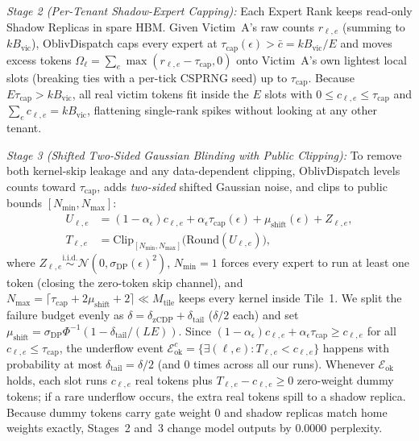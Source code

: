 \documentclass[11pt,a4paper]{article}
\renewcommand{\_}{\textunderscore\allowbreak}
\def\OD{OblivDispatch}%
\theoremstyle{definition}
\theoremstyle{remark}
\newcommand{\OD}{\textsc{OblivDispatch}}
\begin{document}
\emph{Stage 2 (Per-Tenant Shadow-Expert Capping):} Each Expert Rank keeps read-only Shadow Replicas in spare HBM. Given Victim~A's raw counts $r_{\ell, e}$ (summing to $k B_{\mathrm{vic}}$), \OD{} caps every expert at $\tau_{\mathrm{cap}}(\epsilon) > \bar{c} = k B_{\mathrm{vic}}/E$ and moves excess tokens $\Omega_\ell = \sum_e \max(r_{\ell, e} - \tau_{\mathrm{cap}}, 0)$ onto Victim~A's own lightest local slots (breaking ties with a per-tick CSPRNG seed) up to $\tau_{\mathrm{cap}}$. Because $E \tau_{\mathrm{cap}} > k B_{\mathrm{vic}}$, all real victim tokens fit inside the $E$ slots with $0 \le c_{\ell, e} \le \tau_{\mathrm{cap}}$ and $\sum_e c_{\ell, e} = k B_{\mathrm{vic}}$, flattening single-rank spikes without looking at any other tenant.

\emph{Stage 3 (Shifted Two-Sided Gaussian Blinding with Public Clipping):} To remove both kernel-skip leakage and any data-dependent clipping, \OD{} levels counts toward $\tau_{\mathrm{cap}}$, adds \emph{two-sided} shifted Gaussian noise, and clips to public bounds $[N_{\min}, N_{\max}]$:
\begin{align}\label{eq:dp_pad}
  U_{\ell, e} &= (1 - \alpha_\epsilon) c_{\ell, e} + \alpha_\epsilon \tau_{\mathrm{cap}}(\epsilon) + \mu_{\mathrm{shift}}(\epsilon) + Z_{\ell, e}, \nonumber\\
  T_{\ell, e} &= \mathrm{Clip}_{[N_{\min}, N_{\max}]}\!\big(\mathrm{Round}(U_{\ell, e})\big),
\end{align}
where $Z_{\ell, e} \stackrel{\mathrm{i.i.d.}}{\sim} \mathcal{N}(0, \sigma_{\mathrm{DP}}(\epsilon)^2)$, $N_{\min} = 1$ forces every expert to run at least one token (closing the zero-token skip channel), and $N_{\max} = \lceil \tau_{\mathrm{cap}} + 2\mu_{\mathrm{shift}} + 2 \rceil \ll M_{\mathrm{tile}}$ keeps every kernel inside Tile~1. We split the failure budget evenly as $\delta = \delta_{\mathrm{zCDP}} + \delta_{\mathrm{tail}}$ ($\delta/2$ each) and set $\mu_{\mathrm{shift}} = \sigma_{\mathrm{DP}} \Phi^{-1}(1 - \delta_{\mathrm{tail}}/(LE))$. Since $(1-\alpha_\epsilon)c_{\ell,e} + \alpha_\epsilon\tau_{\mathrm{cap}} \ge c_{\ell,e}$ for all $c_{\ell,e} \le \tau_{\mathrm{cap}}$, the underflow event $\mathcal{E}_{\mathrm{ok}}^c = \{\exists (\ell, e) : T_{\ell, e} < c_{\ell, e}\}$ happens with probability at most $\delta_{\mathrm{tail}} = \delta/2$ (and $0$ times across all our runs). Whenever $\mathcal{E}_{\mathrm{ok}}$ holds, each slot runs $c_{\ell, e}$ real tokens plus $T_{\ell, e} - c_{\ell, e} \ge 0$ zero-weight dummy tokens; if a rare underflow occurs, the extra real tokens spill to a shadow replica. Because dummy tokens carry gate weight $0$ and shadow replicas match home weights exactly, Stages~2 and~3 change model outputs by $0.0000$ perplexity.
\end{document}
